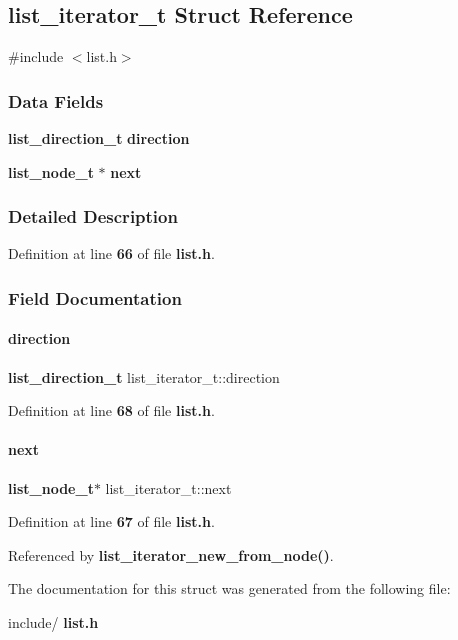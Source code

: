 \subsection{list\+\_\+iterator\+\_\+t Struct Reference}
\label{a00175}


{\ttfamily \#include $<$list.\+h$>$}

\subsubsection*{Data Fields}
\begin{DoxyCompactItemize}
\item 
\textbf{ list\+\_\+direction\+\_\+t} \textbf{ direction}
\item 
\textbf{ list\+\_\+node\+\_\+t} $\ast$ \textbf{ next}
\end{DoxyCompactItemize}


\subsubsection{Detailed Description}


Definition at line \textbf{ 66} of file \textbf{ list.\+h}.



\subsubsection{Field Documentation}
\mbox{\label{a00175_aa95ac6753d9a9e3671e4c21f3d05b32a}} 
\paragraph{direction}
{\footnotesize\ttfamily \textbf{ list\+\_\+direction\+\_\+t} list\+\_\+iterator\+\_\+t\+::direction}



Definition at line \textbf{ 68} of file \textbf{ list.\+h}.

\mbox{\label{a00175_adfc911fa0f601936c4a58c95a08737ee}} 
\paragraph{next}
{\footnotesize\ttfamily \textbf{ list\+\_\+node\+\_\+t}$\ast$ list\+\_\+iterator\+\_\+t\+::next}



Definition at line \textbf{ 67} of file \textbf{ list.\+h}.



Referenced by \textbf{ list\+\_\+iterator\+\_\+new\+\_\+from\+\_\+node()}.



The documentation for this struct was generated from the following file\+:\begin{DoxyCompactItemize}
\item 
include/\textbf{ list.\+h}\end{DoxyCompactItemize}
